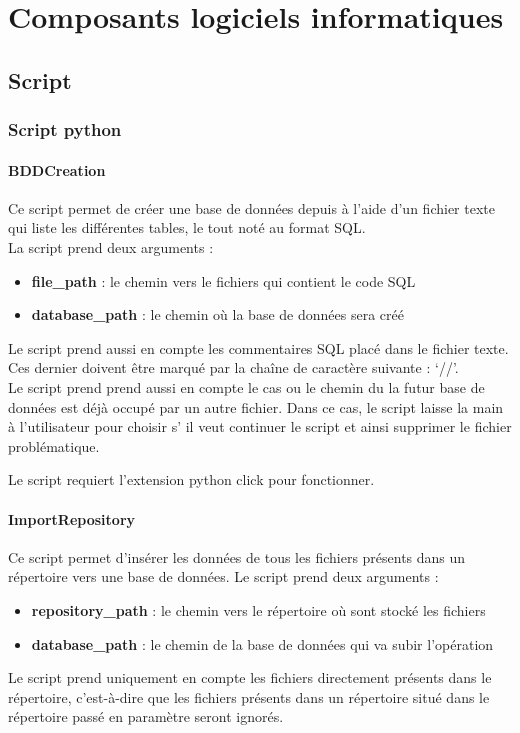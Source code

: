 \chapter{Composants logiciels informatiques}
 \minitoc
\section{Script}
\subsection{Script python}
\subsubsection{BDDCreation}
Ce script permet de créer une base de données depuis à l’aide d’un fichier texte qui liste les différentes tables, le tout noté au format SQL. \\
La script prend deux arguments :
\begin{itemize}
    \item \textbf{file\_path} : le chemin vers le fichiers qui contient le code SQL
    \item \textbf{database\_path} : le chemin où la base de données sera créé
\end{itemize} 

Le script prend aussi en compte les commentaires SQL placé dans le fichier texte. Ces dernier doivent être marqué par la chaîne de caractère suivante : ‘//’.\\
Le script prend prend aussi en compte le cas ou le chemin du la futur base de données est déjà occupé par un autre fichier. Dans ce cas, le script laisse la main à l'utilisateur pour choisir s' il veut continuer le script et ainsi supprimer le fichier problématique.

Le script requiert l'extension python click pour fonctionner.


\subsubsection{ImportRepository}
Ce script permet d'insérer les données de tous les fichiers présents dans un répertoire vers une base de données.
Le script prend deux arguments : 
\begin{itemize}
    \item \textbf{repository\_path} : le chemin vers le répertoire où sont stocké les fichiers
    \item \textbf{database\_path} : le chemin de la base de données qui va subir l’opération
\end{itemize}
Le script prend uniquement en compte les fichiers directement présents dans le répertoire, c'est-à-dire que les fichiers présents dans un répertoire situé dans le répertoire passé en paramètre seront ignorés.

